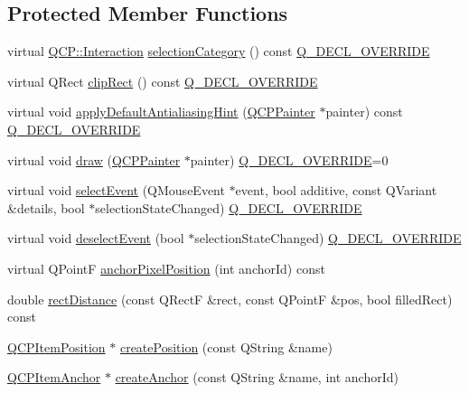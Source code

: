 \subsection*{Protected Member Functions}
\begin{DoxyCompactItemize}
\item 
virtual \mbox{\hyperlink{namespace_q_c_p_a2ad6bb6281c7c2d593d4277b44c2b037}{Q\+C\+P\+::\+Interaction}} \mbox{\hyperlink{class_q_c_p_abstract_item_aceb5f99c361cf023c7cbe7339ea29571}{selection\+Category}} () const \mbox{\hyperlink{qcustomplot_8h_a42cc5eaeb25b85f8b52d2a4b94c56f55}{Q\+\_\+\+D\+E\+C\+L\+\_\+\+O\+V\+E\+R\+R\+I\+DE}}
\item 
virtual Q\+Rect \mbox{\hyperlink{class_q_c_p_abstract_item_a6ad60000f29afe11035e1f791dcbd45a}{clip\+Rect}} () const \mbox{\hyperlink{qcustomplot_8h_a42cc5eaeb25b85f8b52d2a4b94c56f55}{Q\+\_\+\+D\+E\+C\+L\+\_\+\+O\+V\+E\+R\+R\+I\+DE}}
\item 
virtual void \mbox{\hyperlink{class_q_c_p_abstract_item_a5579ce9ec7cad202499886b042448b10}{apply\+Default\+Antialiasing\+Hint}} (\mbox{\hyperlink{class_q_c_p_painter}{Q\+C\+P\+Painter}} $\ast$painter) const \mbox{\hyperlink{qcustomplot_8h_a42cc5eaeb25b85f8b52d2a4b94c56f55}{Q\+\_\+\+D\+E\+C\+L\+\_\+\+O\+V\+E\+R\+R\+I\+DE}}
\item 
virtual void \mbox{\hyperlink{class_q_c_p_abstract_item_a007fdab79c935a5da5aa04a21d268c18}{draw}} (\mbox{\hyperlink{class_q_c_p_painter}{Q\+C\+P\+Painter}} $\ast$painter) \mbox{\hyperlink{qcustomplot_8h_a42cc5eaeb25b85f8b52d2a4b94c56f55}{Q\+\_\+\+D\+E\+C\+L\+\_\+\+O\+V\+E\+R\+R\+I\+DE}}=0
\item 
virtual void \mbox{\hyperlink{class_q_c_p_abstract_item_aa4b969c58797f39c9c0b6c07c7869d17}{select\+Event}} (Q\+Mouse\+Event $\ast$event, bool additive, const Q\+Variant \&details, bool $\ast$selection\+State\+Changed) \mbox{\hyperlink{qcustomplot_8h_a42cc5eaeb25b85f8b52d2a4b94c56f55}{Q\+\_\+\+D\+E\+C\+L\+\_\+\+O\+V\+E\+R\+R\+I\+DE}}
\item 
virtual void \mbox{\hyperlink{class_q_c_p_abstract_item_af9093798cb07a861dcc73f93ca16c0c1}{deselect\+Event}} (bool $\ast$selection\+State\+Changed) \mbox{\hyperlink{qcustomplot_8h_a42cc5eaeb25b85f8b52d2a4b94c56f55}{Q\+\_\+\+D\+E\+C\+L\+\_\+\+O\+V\+E\+R\+R\+I\+DE}}
\item 
virtual Q\+PointF \mbox{\hyperlink{class_q_c_p_abstract_item_ada5bad4e1196c4fc0d0d12328e24b8f2}{anchor\+Pixel\+Position}} (int anchor\+Id) const
\item 
double \mbox{\hyperlink{class_q_c_p_abstract_item_a7dfc2007e36d09b8b5c988a9f06d6a7e}{rect\+Distance}} (const Q\+RectF \&rect, const Q\+PointF \&pos, bool filled\+Rect) const
\item 
\mbox{\hyperlink{class_q_c_p_item_position}{Q\+C\+P\+Item\+Position}} $\ast$ \mbox{\hyperlink{class_q_c_p_abstract_item_a75036d39c4d4e2e1a7dd145fff915d32}{create\+Position}} (const Q\+String \&name)
\item 
\mbox{\hyperlink{class_q_c_p_item_anchor}{Q\+C\+P\+Item\+Anchor}} $\ast$ \mbox{\hyperlink{class_q_c_p_abstract_item_af3fc92527802078ca395138748b629a7}{create\+Anchor}} (const Q\+String \&name, int anchor\+Id)
\end{DoxyCompactItemize}
